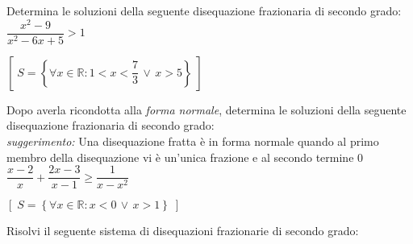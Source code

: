 \documentclass[11pt, a4paper]{exam}
\begin{document}
\begin{questions}

\addpoints
\question[6]
Determina le soluzioni della seguente disequazione frazionaria di secondo grado:\\

\(\dfrac{x^2 - 9}{x^2 - 6x + 5} > 1\)

{\footnotesize
\begin{solution}
	\( \left[\; S = \left\{ \forall x \in \mathbb{R}: 1 < x < \dfrac{7}{3} \, \vee \, x > 5 \right\} \; \right] \) 
\end{solution}
}
%
%
\vspace{.5cm}


\addpoints
\question [6]
Dopo averla ricondotta alla {\em forma normale}, determina le soluzioni della seguente disequazione frazionaria di secondo grado:\\
{\footnotesize
{\em suggerimento:} Una disequazione fratta è in forma normale quando al primo membro della disequazione vi è un'unica frazione e al secondo termine \(0\)
}\\

\(\dfrac{x - 2}{x} + \dfrac{2x - 3}{x - 1} \ge \dfrac{1}{x - x^2}\)


{\footnotesize
\begin{solution}
	\( \left[\; S = \left\{ \forall x \in \mathbb{R}: x < 0 \, \vee \, x > 1 \right\} \; \right] \) 
\end{solution}
\vspace{.5cm}
}
\addpoints
\question [8] Risolvi il seguente sistema di disequazioni frazionarie di secondo grado: \\


\end{questions}
\end{document}

